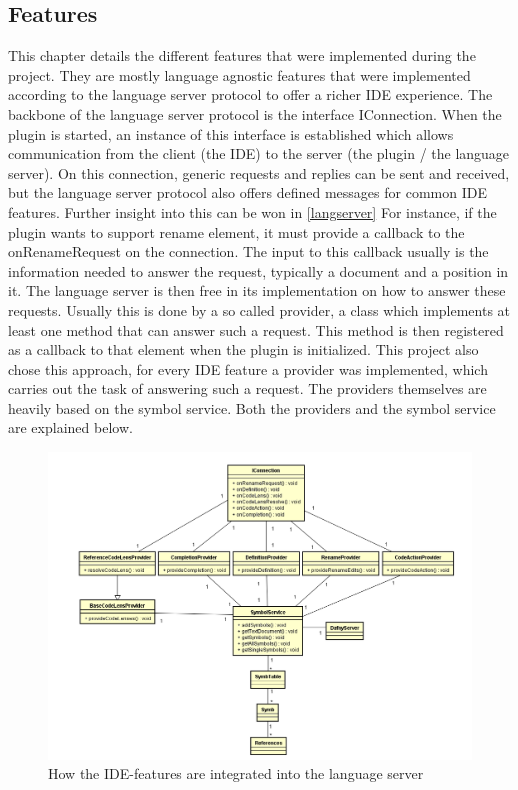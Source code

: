 \subsection{Features} \label{features}
This chapter details the different features that were implemented during the project. They are mostly language agnostic features that were implemented according to the language server protocol to offer a richer IDE experience. The backbone of the language server protocol is the interface IConnection. When the plugin is started, an instance of this interface is established which allows communication from the client (the IDE) to the server (the plugin / the language server). On this connection, generic requests and replies can be sent and received, but the language server protocol also offers defined messages for common IDE features. Further insight into this can be won in \ref{langserver} \newline
For instance, if the plugin wants to support rename element, it must provide a callback to the onRenameRequest on the connection. The input to this callback usually is the information needed to answer the request, typically a document and a position in it. The language server is then free in its implementation on how to answer these requests. \newline
Usually this is done by a so called provider, a class which implements at least one method that can answer such a request. This method is then registered as a callback to that element when the plugin is initialized.\newline
This project also chose this approach, for every IDE feature a provider was implemented, which carries out the task of answering such a request. The providers themselves are heavily based on the symbol service. Both the providers and the symbol service are explained below.\newline 
\begin{figure}[H]
	\centering
	\includegraphics[width=1\textwidth]{img/featureArchitecture}
	\caption{How the IDE-features are integrated into the language server}
	\label{fig:featurearchitecture}
\end{figure}
